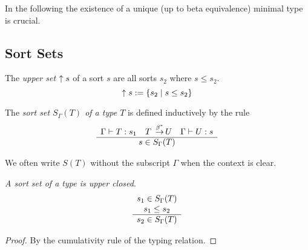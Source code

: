 \begin{comment}
            We reduce the rightmost redex of degree d and claim that this
            reduces n by one. We continue until n=0 i.e. there are no more
            redexes of degree d.

            We continue this process until there are no more redexes of level i.

            The i-normal term is unique because the rightmost redex is unique.
            Therefore we have found the reduction function ri.

        Crucial in the construction: The reduction of the rightmost redex of the
        highest degree does not make new redexes of this degree.
\end{comment}



In the following the existence of a unique (up to beta equivalence) minimal type
is crucial.





\subsection{Sort Sets}


\begin{definition}
    \label{def:UpperSet}
    The \emph{upper set} ${\uparrow s}$ of a sort $s$ are all sorts
    $s_2$ where $s \le s_2$.
    $$
    {\uparrow s} := {\left\{s_2 \mid s \le s_2\right\}}
    $$
\end{definition}




\begin{definition}
    \label{def:SortSet}
    The \emph{sort set $S_\Gamma(T)$ of a type $T$} is defined inductively by
    the rule
    $$
    \ruleh{
        \Gamma \vdash T : s_1\quad
        T \reducestar U\quad
        \Gamma \vdash U : s
    }
    {
        s \in S_\Gamma(T)
    }
    $$

    We often write $S(T)$ without the subscript $\Gamma$ when the context is
    clear.
\end{definition}





\begin{theorem}
    \label{thm:SortSetUpperClosed}
    \emph{A sort set of a type is upper closed}.
    $$
        \begin{array}{c} 
            s_1 \in S_\Gamma(T)
            \\
            s_1 \le s_2
         \\ \hline 
            s_2 \in S_\Gamma(T)
        \end{array}
    $$
    \begin{proof}
        By the cumulativity rule of the typing relation.
    \end{proof}
\end{theorem}


